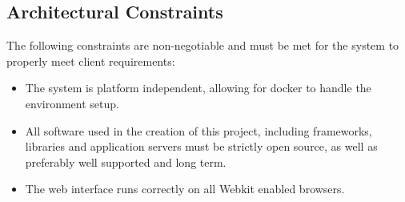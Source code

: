 \documentclass[11pt,a4paper]{article}
\begin{document}
\subsection{Architectural Constraints}
The following constraints are non-negotiable and must be met for the system to properly meet client requirements:
\begin{itemize}
	\item The system is platform independent, allowing for docker to handle the environment setup.
	\item All software used in the creation of this project, including frameworks, libraries and application servers must be strictly open source, as well as preferably well supported and long term.
	\item The web interface runs correctly on all Webkit enabled browsers.
\end{itemize}
\end{document}
